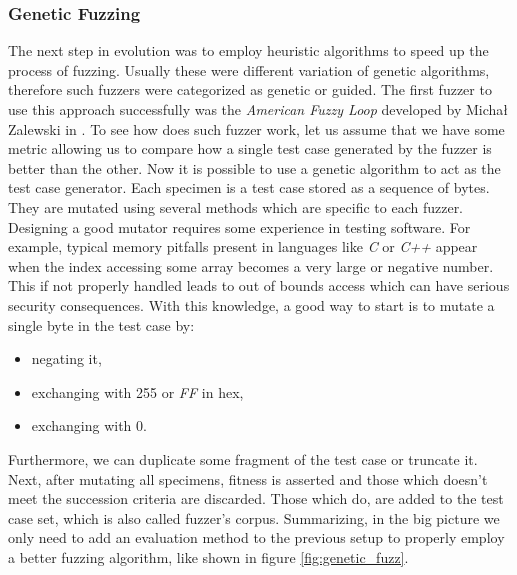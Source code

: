 \subsubsection{Genetic Fuzzing}

The next step in evolution was to employ heuristic algorithms to speed up the process of fuzzing. Usually these were different variation of genetic algorithms, therefore such fuzzers were categorized as genetic or guided. The first fuzzer to use this approach successfully was the \textit{American Fuzzy Loop} developed by Michał Zalewski in \cite{afl}. To see how does such fuzzer work, let us assume that we have some metric allowing us to compare how a single test case generated by the fuzzer is better than the other. Now it is possible to use a genetic algorithm to act as the test case generator. Each specimen is a test case stored as a sequence of bytes. They are mutated using several methods which are specific to each fuzzer. Designing a good mutator requires some experience in testing software. For example, typical memory pitfalls present in languages like \textit{C} or \textit{C++} appear when the index accessing some array becomes a very large or negative number. This if not properly handled leads to out of bounds access which can have serious security consequences. With this knowledge, a good way to start is to mutate a single byte in the test case by:
\begin{itemize}
    \item negating it,
    \item exchanging with 255 or \textit{FF} in hex,
    \item exchanging with 0.
\end{itemize}
Furthermore, we can duplicate some fragment of the test case or truncate it. Next, after mutating all specimens, fitness is asserted and those which doesn't meet the succession criteria are discarded. Those which do, are added to the test case set, which is also called fuzzer's corpus. Summarizing, in the big picture we only need to add an evaluation method to the previous setup to properly employ a better fuzzing algorithm, like shown in figure \ref{fig:genetic_fuzz}.  

